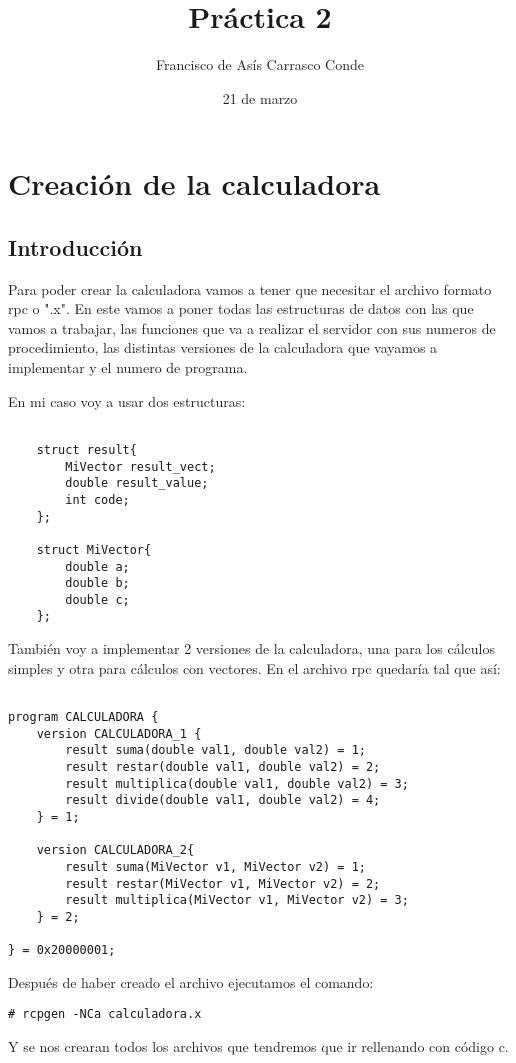 \documentclass[12pt]{book}
\title {Práctica 2}
\date{21 de marzo}
\author{Francisco de Asís Carrasco Conde}
\begin{document}
\maketitle
\tableofcontents

\chapter{Creación de la calculadora}
    \section{Introducción}
        Para poder crear la calculadora vamos a tener que necesitar el archivo formato rpc o ".x".
        En este vamos a poner todas las estructuras de datos con las que vamos a trabajar, las funciones
        que va a realizar el servidor con sus numeros de procedimiento, las distintas versiones de la calculadora
        que vayamos a implementar y el numero de programa.

        En mi caso voy a usar dos estructuras:
    \begin{lstlisting}

    struct result{
        MiVector result_vect;
        double result_value;
        int code;
    };

    struct MiVector{
        double a;
        double b; 
        double c;
    };
    \end{lstlisting}

        También voy a implementar 2 versiones de la calculadora, una para los cálculos simples y otra para cálculos
        con vectores. En el archivo rpc quedaría tal que así:

        \newpage
        \begin{lstlisting}

program CALCULADORA {
    version CALCULADORA_1 {
        result suma(double val1, double val2) = 1;
        result restar(double val1, double val2) = 2;
        result multiplica(double val1, double val2) = 3;
        result divide(double val1, double val2) = 4;
    } = 1;
        
    version CALCULADORA_2{
        result suma(MiVector v1, MiVector v2) = 1;
        result restar(MiVector v1, MiVector v2) = 2;
        result multiplica(MiVector v1, MiVector v2) = 3;
    } = 2;
        
} = 0x20000001;

        \end{lstlisting}

Después de haber creado el archivo ejecutamos el comando:
\begin{lstlisting}
# rcpgen -NCa calculadora.x
\end{lstlisting}
Y se nos crearan todos los archivos que tendremos que ir rellenando con código c.
\end{document}
